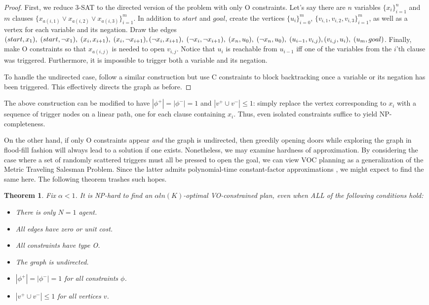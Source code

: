 \documentclass[letterpaper]{article}
\newtheorem{thm}{Theorem}
\begin{document}
\begin{proof}
First, we reduce 3-SAT to the directed version of the problem with only O constraints. Let's say there are $n$ variables $\{x_i\}_{i=1}^n$ and $m$ clauses $\{x_{a(i,1)} \vee x_{a(i,2)} \vee x_{a(i,3)} \}_{i=1}^m$. In addition to $start$ and $goal$, create the vertices $\{u_i\}_{i=0}^m$, $\{v_{i,1},v_{i,2},v_{i,3}\}_{i=1}^m$, as well as a vertex for each variable and its negation. Draw the edges
$(start,x_1),\;(start,\neg x_1),\;(x_i,x_{i+1}),\;(x_i,\neg x_{i+1}),\;
\\(\neg x_i,x_{i+1}),\;(\neg x_i,\neg x_{i+1}),\;(x_n,u_0),\;(\neg x_n,u_0),\;(u_{i-1},v_{i,j}),\;
\\(v_{i,j},u_i),\;(u_m,goal)$.
Finally, make O constraints so that $x_{a(i,j)}$ is needed to open $v_{i,j}$. Notice that $u_i$ is reachable from $u_{i-1}$ iff one of the variables from the $i$'th clause was triggered. Furthermore, it is impossible to trigger both a variable and its negation.

To handle the undirected case, follow a similar construction but use C constraints to block backtracking once a variable or its negation has been triggered. This effectively directs the graph as before.
\end{proof}

The above construction can be modified to have $|\phi^+| = |\phi^-| = 1$ and $|v^+ \cup v^-| \le 1$: simply replace the vertex corresponding to $x_i$ with a sequence of trigger nodes on a linear path, one for each clause containing $x_i$. Thus, even isolated constraints suffice to yield NP-completeness.

On the other hand, if only O constraints appear \emph{and} the graph is undirected, then greedily opening doors while exploring the graph in flood-fill fashion will always lead to a solution if one exists. Nonetheless, we may examine hardness of approximation. By considering the case where a set of randomly scattered triggers must all be pressed to open the goal, we can view VOC planning as a generalization of the Metric Traveling Salesman Problem. Since the latter admits polynomial-time constant-factor approximations \cite{christofides1976worst}, we might expect to find the same here. The following theorem trashes such hopes.

\begin{thm}
\label{thm:NP2}
Fix $\alpha < 1$. It is NP-hard to find an $\alpha ln(K)$-optimal VO-constrained plan, even when ALL of the following conditions hold:
\begin{itemize}
\item There is only $N=1$ agent.
\item All edges have zero or unit cost.
\item All constraints have type O.
\item The graph is undirected.
\item $|\phi^+| = |\phi^-| = 1$ for all constraints $\phi$.
\item $|v^+ \cup v^-| \le 1$ for all vertices $v$.
\end{itemize}
\end{thm}
\end{document}

